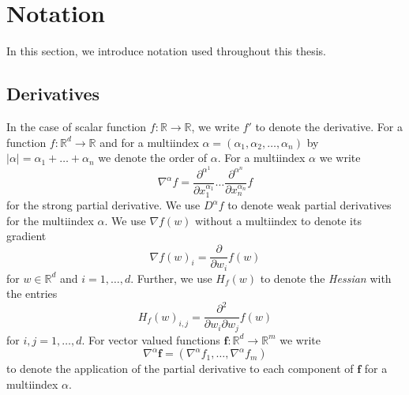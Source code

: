 \documentclass[12pt]{article}
\theoremstyle{definition}
\numberwithin{equation}{section}
\newcommand{\R}{\mathbb{R}}
\begin{document}
\section{Notation}
\label{sec:notation}
In this section, we introduce notation used throughout this thesis.
\subsection{Derivatives}
In the case of scalar function $f: \R \rightarrow \R$, we write $f'$ to denote the derivative.
For a function $f : \R^d \rightarrow \R$ and for a multiindex $\alpha = (\alpha_1, \alpha_2, \dots, \alpha_n)$ by $|\alpha| = \alpha_1 + \dots + \alpha_n$ we denote the order of $\alpha$.
For a multiindex $\alpha$ we write 
\begin{equation*}
  \nabla^{\alpha} f = \frac{\partial^{\alpha^1}}{\partial x_1^{\alpha_1}}\dots\frac{\partial^{\alpha^n}}{\partial x_n^{\alpha_n}} f
\end{equation*}
for the strong partial derivative. We use $D^{\alpha}f$ to denote weak partial derivatives for the multiindex $\alpha$. We use $\nabla f(w)$ without a multiindex to denote its gradient 
\begin{equation*}
  \nabla f(w)_i = \frac{\partial}{\partial w_i} f(w)  
\end{equation*}
 for $w \in \R^d$ and $i=1,\dots,d$. Further, we use $H_f(w)$ to denote the \emph{Hessian} with the entries 
 \begin{equation*}
  H_f(w)_{i,j} = \frac{\partial^2}{\partial w_i \partial w_j} f(w)
 \end{equation*}
 for $i,j=1,\dots,d$. For vector valued functions $\mathbf{f} : \R^d \rightarrow \R^m$ we write 
 \begin{equation*}
  \nabla^{\alpha}\mathbf{f} = (\nabla^{\alpha}f_1, \dots, \nabla^{\alpha}f_m) 
 \end{equation*}
 to denote the application of the partial derivative to each component of $\mathbf{f}$ for a multiindex $\alpha$.
\end{document}
